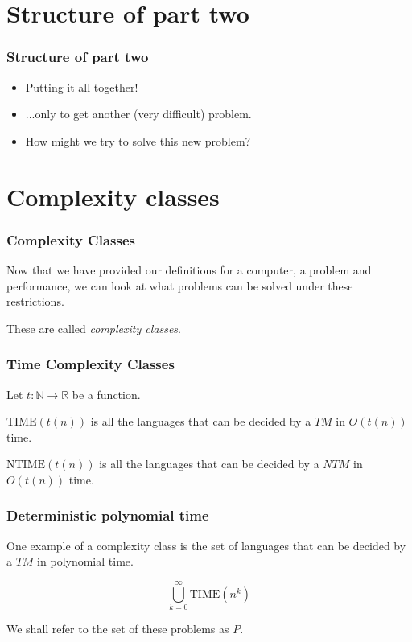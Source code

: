 \documentclass[aspectratio=169]{beamer}
\begin{document}
\section{Structure of part two}

\begin{frame}
\frametitle{Structure of part two}
\begin{itemize}
    \item Putting it all together!
    \item ...only to get another (very difficult) problem.
    \item How might we try to solve this new problem?
\end{itemize}
\end{frame}

\section{Complexity classes}

\begin{frame}
\frametitle{Complexity Classes}
Now that we have provided our definitions for a computer, a problem and performance, we can look at what problems can be solved under these restrictions.

These are called {\em complexity classes}.
\end{frame}

\begin{frame}
\frametitle{Time Complexity Classes}
Let $t: \mathbb{N} \to \mathbb{R}$ be a function.

$\mathrm{TIME}(t(n))$ is all the languages that can be decided by a $TM$ in $O(t(n))$ time.

$\mathrm{NTIME}(t(n))$ is all the languages that can be decided by a $NTM$ in $O(t(n))$ time.
\end{frame}

\begin{frame}
\frametitle{Deterministic polynomial time}
One example of a complexity class is the set of languages that can be decided by a $TM$ in polynomial time.

$$\bigcup_{k = 0}^{\infty} \mathrm{TIME}(n^k)$$

We shall refer to the set of these problems as $P$.
\end{frame}
\end{document}
